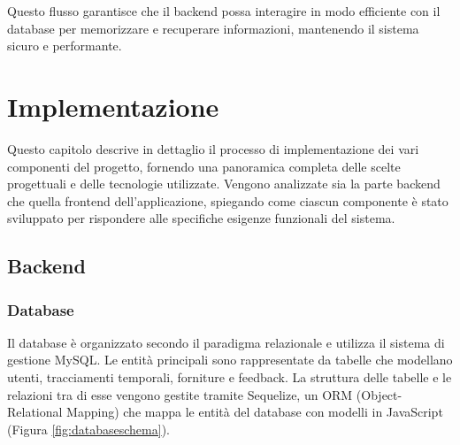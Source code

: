 \documentclass[twoside]{supsistudent}
\begin{document}
Questo flusso garantisce che il backend possa interagire in modo efficiente con il database per memorizzare e recuperare informazioni, mantenendo il sistema sicuro e performante.

\chapter{Implementazione}

Questo capitolo descrive in dettaglio il processo di implementazione dei vari componenti del progetto, fornendo una panoramica completa delle scelte progettuali e delle tecnologie utilizzate. Vengono analizzate sia la parte backend che quella frontend dell'applicazione, spiegando come ciascun componente è stato sviluppato per rispondere alle specifiche esigenze funzionali del sistema.
\section{Backend}
\subsection{Database}
Il database è organizzato secondo il paradigma relazionale e utilizza il sistema di gestione MySQL. Le entità principali sono rappresentate da tabelle che modellano utenti, tracciamenti temporali, forniture e feedback. La struttura delle tabelle e le relazioni tra di esse vengono gestite tramite Sequelize, un ORM (Object-Relational Mapping) che mappa le entità del database con modelli in JavaScript (Figura \ref{fig:databaseschema}).
\end{document}
